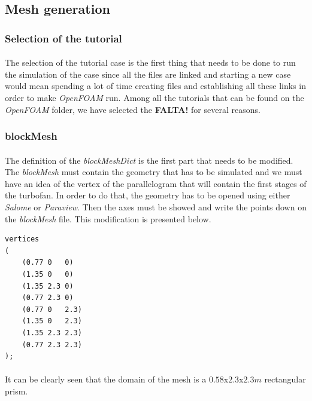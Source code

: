 \subsection{Mesh generation}

\subsubsection{Selection of the tutorial}

\paragraph{}The selection of the tutorial case is the first thing that needs to be done to run the simulation of the case since all the files are linked and starting a new case would mean spending a lot of time creating files and establishing all these links in order to make \textit{OpenFOAM} run. Among all the tutorials that can be found on the \textit{OpenFOAM} folder, we have selected the \textbf{FALTA!} for several reasons.

\subsubsection{blockMesh}

\paragraph{}The definition of the \textit{blockMeshDict} is the first part that needs to be modified. The \textit{blockMesh} must contain the geometry that has to be simulated and we must have an idea of the vertex of the parallelogram that will contain the first stages of the turbofan. In order to do that, the geometry has to be opened using either \textit{Salome} or \textit{Paraview}. Then the axes must be showed and write the points down on the \textit{blockMesh} file. This modification is presented below.

\begin{footnotesize}
\begin{verbatim}
vertices
(
    (0.77 0   0)
    (1.35 0   0)
    (1.35 2.3 0)
    (0.77 2.3 0)
    (0.77 0   2.3)
    (1.35 0   2.3)
    (1.35 2.3 2.3)
    (0.77 2.3 2.3)
);
\end{verbatim}
\end{footnotesize}

\paragraph{}It can be clearly seen that the domain of the mesh is a $0.58$x$2.3$x$2.3m$ rectangular prism.

